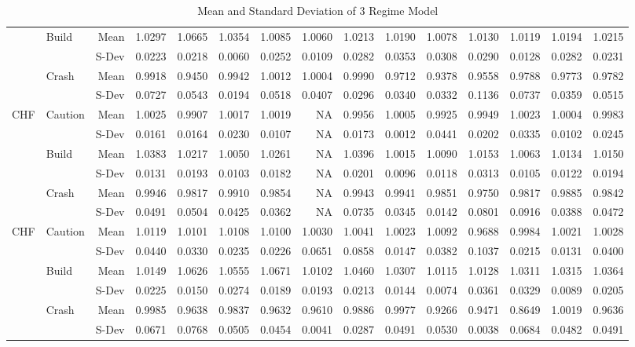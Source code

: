 \documentclass[12pt, a4paper, oneside]{article} %
\begin{document}
\begin{landscape}
\begin{table}[ht]
\begin{tabular}{llrrrrrrrrrrrrr}
  & \multirow{2}{*}{Build} & Mean & 1.0297 & 1.0665 & 1.0354 & 1.0085 & 1.0060 & 1.0213 & 1.0190 & 1.0078 & 1.0130 & 1.0119 & 1.0194 & 1.0215\\ 
  && S-Dev & 0.0223 & 0.0218 & 0.0060 & 0.0252 & 0.0109 & 0.0282 & 0.0353 & 0.0308 & 0.0290 & 0.0128 & 0.0282 & 0.0231 \\ 
  & \multirow{2}{*}{Crash} & Mean & 0.9918 & 0.9450 & 0.9942 & 1.0012 & 1.0004 & 0.9990 & 0.9712 & 0.9378 & 0.9558 & 0.9788 & 0.9773 & 0.9782\\ 
  && S-Dev & 0.0727 & 0.0543 & 0.0194 & 0.0518 & 0.0407 & 0.0296 & 0.0340 & 0.0332 & 0.1136 & 0.0737 & 0.0359 & 0.0515\\ 
\hline
\multirow{6}{*}{CHF}& \multirow{2}{*}{Caution} & Mean& 1.0025 & 0.9907 & 1.0017 & 1.0019 & NA & 0.9956 & 1.0005 & 0.9925 & 0.9949 & 1.0023 & 1.0004 & 0.9983\\ 
  && S-Dev & 0.0161 & 0.0164 & 0.0230 & 0.0107 & NA & 0.0173 & 0.0012 & 0.0441 & 0.0202 & 0.0335 & 0.0102 & 0.0245\\ 
  & \multirow{2}{*}{Build} &  Mean & 1.0383 & 1.0217 & 1.0050 & 1.0261 & NA & 1.0396 & 1.0015 & 1.0090 & 1.0153 & 1.0063 & 1.0134 & 1.0150\\ 
  && S-Dev & 0.0131 & 0.0193 & 0.0103 & 0.0182 & NA & 0.0201 & 0.0096 & 0.0118 & 0.0313 & 0.0105 & 0.0122 & 0.0194\\ 
  & \multirow{2}{*}{Crash} & Mean & 0.9946 & 0.9817 & 0.9910 & 0.9854 & NA & 0.9943 & 0.9941 & 0.9851 & 0.9750 & 0.9817 & 0.9885 & 0.9842 \\ 
  &&S-Dev & 0.0491 & 0.0504 & 0.0425 & 0.0362 & NA & 0.0735 & 0.0345 & 0.0142 & 0.0801 & 0.0916 & 0.0388 & 0.0472\\ 
\hline
\multirow{6}{*}{CHF}& \multirow{2}{*}{Caution} & Mean & 1.0119 & 1.0101 & 1.0108 & 1.0100 & 1.0030 & 1.0041 & 1.0023 & 1.0092 & 0.9688 & 0.9984 & 1.0021 & 1.0028\\ 
  && S-Dev& 0.0440 & 0.0330 & 0.0235 & 0.0226 & 0.0651 & 0.0858 & 0.0147 & 0.0382 & 0.1037 & 0.0215 & 0.0131 & 0.0400\\ 
  & \multirow{2}{*}{Build} & Mean & 1.0149 & 1.0626 & 1.0555 & 1.0671 & 1.0102 & 1.0460 & 1.0307 & 1.0115 & 1.0128 & 1.0311 & 1.0315 & 1.0364\\ 
  && S-Dev & 0.0225 & 0.0150 & 0.0274 & 0.0189 & 0.0193 & 0.0213 & 0.0144 & 0.0074 & 0.0361 & 0.0329 & 0.0089 & 0.0205\\ 
  & \multirow{2}{*}{Crash} & Mean & 0.9985 & 0.9638 & 0.9837 & 0.9632 & 0.9610 & 0.9886 & 0.9977 & 0.9266 & 0.9471 & 0.8649 & 1.0019 & 0.9636 \\ 
  && S-Dev& 0.0671 & 0.0768 & 0.0505 & 0.0454 & 0.0041 & 0.0287 & 0.0491 & 0.0530 & 0.0038 & 0.0684 & 0.0482 & 0.0491\\ 
   \hline
\end{tabular}
\caption{Mean and Standard Deviation of 3 Regime Model}
\label{tabref:3statemod}
\end{table}
\end{landscape}
\end{document}
